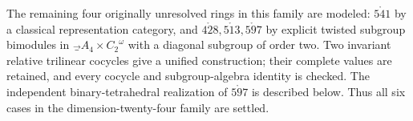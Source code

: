 The remaining four originally unresolved rings in this family are modeled:
$\ring{541}$ by a classical representation category, and
$\ring{428},\ring{513},\ring{597}$ by explicit twisted subgroup bimodules in
$\Vec_{A_4\times C_2}^{\omega}$ with a diagonal subgroup of order two.
Two invariant relative trilinear cocycles give a unified construction; their complete
values are retained, and every cocycle and subgroup-algebra identity is checked.
The independent binary-tetrahedral realization of $\ring{597}$ is described below.
Thus all six cases in the dimension-twenty-four family are settled.
